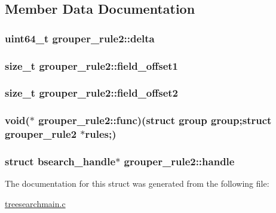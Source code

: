 \subsection{\-Member \-Data \-Documentation}
\hypertarget{structgrouper__rule2_a5d3e8bac70fa71af6a4d2e09508fd8fe}{
\subsubsection[{delta}]{\setlength{\rightskip}{0pt plus 5cm}uint64\-\_\-t {\bf grouper\-\_\-rule2\-::delta}}}\label{structgrouper__rule2_a5d3e8bac70fa71af6a4d2e09508fd8fe}
\hypertarget{structgrouper__rule2_a154036e34c1a214dac9922443a3cb490}{
\subsubsection[{field\-\_\-offset1}]{\setlength{\rightskip}{0pt plus 5cm}size\-\_\-t {\bf grouper\-\_\-rule2\-::field\-\_\-offset1}}}\label{structgrouper__rule2_a154036e34c1a214dac9922443a3cb490}
\hypertarget{structgrouper__rule2_abb8b051b08d21287edeae8010b94c2ff}{
\subsubsection[{field\-\_\-offset2}]{\setlength{\rightskip}{0pt plus 5cm}size\-\_\-t {\bf grouper\-\_\-rule2\-::field\-\_\-offset2}}}\label{structgrouper__rule2_abb8b051b08d21287edeae8010b94c2ff}
\hypertarget{structgrouper__rule2_a1fbace28813b22c9d2437c5c380e0c8a}{
\subsubsection[{func}]{\setlength{\rightskip}{0pt plus 5cm}void($\ast$ {\bf grouper\-\_\-rule2\-::func})(struct {\bf group} {\bf group};struct {\bf grouper\-\_\-rule2} $\ast$rules;)}}\label{structgrouper__rule2_a1fbace28813b22c9d2437c5c380e0c8a}
\hypertarget{structgrouper__rule2_a89c0c04ef24df4be1b4c3716eec45a19}{
\subsubsection[{handle}]{\setlength{\rightskip}{0pt plus 5cm}struct {\bf bsearch\-\_\-handle}$\ast$ {\bf grouper\-\_\-rule2\-::handle}}}\label{structgrouper__rule2_a89c0c04ef24df4be1b4c3716eec45a19}


\-The documentation for this struct was generated from the following file\-:\begin{DoxyCompactItemize}
\item 
\hyperlink{treesearchmain_8c}{treesearchmain.\-c}\end{DoxyCompactItemize}
